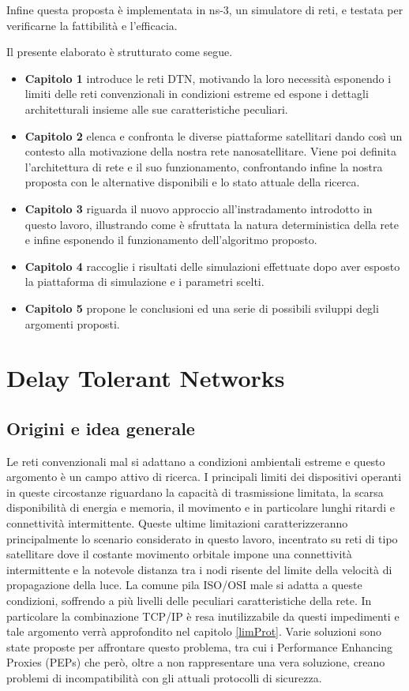 \documentclass[12pt,a4paper,oneside]{book}
\begin{document}
	Infine questa proposta è implementata in ns-3, un simulatore di reti, e testata per verificarne la fattibilità e l'efficacia.
	
	Il presente elaborato è strutturato come segue.
	\begin{itemize}
		\item \textbf{Capitolo 1} introduce le reti DTN, motivando la loro necessità esponendo i limiti delle reti convenzionali in condizioni estreme ed espone i dettagli architetturali insieme alle sue caratteristiche peculiari.
		\item \textbf{Capitolo 2} elenca e confronta le diverse piattaforme satellitari dando così un contesto alla motivazione della nostra rete nanosatellitare. Viene poi definita l'architettura di rete e il suo funzionamento, confrontando infine la nostra proposta con le alternative disponibili e lo stato attuale della ricerca.
		\item \textbf{Capitolo 3} riguarda il nuovo approccio all'instradamento introdotto in questo lavoro, illustrando come è sfruttata la natura deterministica della rete e infine esponendo il funzionamento dell'algoritmo proposto.
		\item \textbf{Capitolo 4} raccoglie i risultati delle simulazioni effettuate dopo aver esposto la piattaforma di simulazione e i parametri scelti.
		\item \textbf{Capitolo 5} propone le conclusioni ed una serie di possibili sviluppi degli argomenti proposti.
	\end{itemize}
	
	\chapter{Delay Tolerant Networks}
		
		\section{Origini e idea generale}
		
		Le reti convenzionali mal si adattano a condizioni ambientali estreme e questo argomento è un campo attivo di ricerca. I principali limiti dei dispositivi operanti in queste circostanze riguardano la capacità di trasmissione limitata, la scarsa disponibilità di energia e memoria, il movimento e in particolare lunghi ritardi e connettività intermittente. Queste ultime limitazioni caratterizzeranno principalmente lo scenario considerato in questo lavoro, incentrato su reti di tipo satellitare dove il costante movimento orbitale impone una connettività intermittente e la notevole distanza tra i nodi risente del limite della velocità di propagazione della luce. La comune pila ISO/OSI male si adatta a queste condizioni, soffrendo a più livelli delle peculiari caratteristiche della rete. In particolare la combinazione TCP/IP è resa inutilizzabile da questi impedimenti e tale argomento verrà approfondito nel capitolo \ref{limProt}. Varie soluzioni sono state proposte per affrontare questo problema, tra cui i Performance Enhancing Proxies (PEPs) \cite{borderperformance} che però, oltre a non rappresentare una vera soluzione, creano problemi di incompatibilità con gli attuali protocolli di sicurezza.
		
\end{document}
